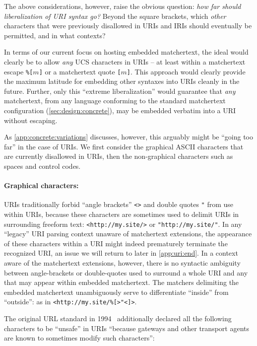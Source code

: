 The above considerations, however,
raise the obvious question:
\emph{how far should liberalization of URI syntax go?}
Beyond the square brackets,
which \emph{other} characters that were previously disallowed in URIs and IRIs
should eventually be permitted, and in what contexts?

In terms of our current focus on hosting embedded matchertext,
the ideal would clearly be to allow \emph{any} UCS characters in URIs --
at least within a matchertext escape \verb|%[|$m$\verb|]|
or a matchertext quote \verb|[|$m$\verb|]|.
This approach would clearly provide the maximum latitude
for embedding other syntaxes into URIs cleanly in the future.
Further, only this ``extreme liberalization''
would guarantee that \emph{any} matchertext,
from any language conforming to the standard matchertext configuration
(\cref{sec:design:concrete}),
may be embedded verbatim into a URI without escaping.

As \cref{app:concrete:variations} discusses,
however,
this arguably might be ``going too far'' in the case of URIs.
We first consider the graphical ASCII characters
that are currently disallowed in URIs,
then the non-graphical characters such as spaces and control codes.

\paragraph{Graphical characters:}

URIs traditionally forbid
``angle brackets'' \verb|<>| and double quotes \verb|"|
from use within URIs,
because these characters are sometimes
used to delimit URIs in surrounding freeform text:
\eg \verb|<http://my.site/>| or \verb|"http://my.site/"|.
In any ``legacy'' URI parsing context unaware of matchertext extensions,
the appearance of these characters within a URI might indeed
prematurely terminate the recognized URI,
an issue we will return to later in \cref{app:uri:end}.
In a context aware of the matchertext extensions, however,
there is no syntactic ambiguity between angle-brackets or double-quotes
used to surround a whole URI
and any that may appear within embedded matchertext.
The matchers delimiting the embedded matchertext
unambiguously serve to differentiate ``inside'' from ``outside'':
\eg as in \verb|<http://my.site/%[>"<]>|.

The original URL standard in 1994~\cite{rfc1738}
additionally declared all the following characters
to be ``unsafe'' in URIs
``because gateways and other transport agents are known to sometimes modify
such characters'':

